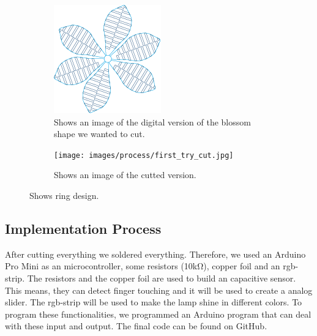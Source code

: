\documentclass[doc.tex]{subfiles}
\begin{document}
        \begin{figure}[h!]
            \centering
            \begin{subfigure}{.5\textwidth}
              \centering
              \includegraphics[width=.8\linewidth]{images/process/first_try_dig.png}
              \caption{Shows an image of the digital version of the blossom shape we wanted to cut.}
              \label{fig:test_shapes}
            \end{subfigure}%
            \begin{subfigure}{.5\textwidth}
              \centering
              \texttt{[image: images/process/first\_try\_cut.jpg]}
              \caption{Shows an image of the cutted version.}
              \label{fig:ringdesign2}
            \end{subfigure}
            \caption{Shows ring design.}
            \label{fig:laserCutTests}
        \end{figure}

    \subsection{Implementation Process}
        \begin{flushleft}
            After cutting everything we soldered everything. Therefore, we used an Arduino Pro Mini \cite{arduinoProMini} 
            as an microcontroller, some resistors (10k\si{\ohm}), copper foil and an rgb-strip. \newline
            The resistors and the copper foil are used to build an capacitive sensor. \cite{Badger2019} 
            This means, they can detect finger touching and it will be used to create a analog slider.
            The rgb-strip will be used to make the lamp shine in different colors. \cite{Burgess2019} 
            \newline 
            \noindent
            To program these functionalities, we programmed an Arduino program that can deal with these input 
            and output. The final code can be found on GitHub. %
        \end{flushleft}
\end{document}
